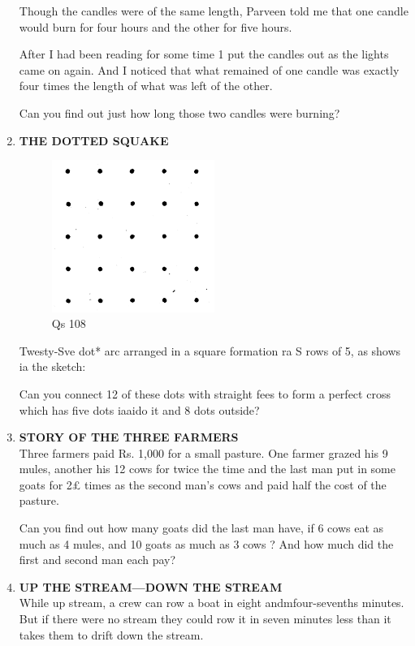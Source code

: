 \documentclass[12pt]{article}
\begin{document}
\begin{enumerate}
Though  the candles  were  of the same  length,  Parveen told me that  one candle  would  burn  for  four  hours  and the other  for five hours. 

After  I had been  reading  for some  time  1 put the candles  out as the lights  came  on again.  And  I noticed that what  remained  of one candle  was  exactly  four  times the length  of what  was  left of the other. 

Can you find  out just  how  long  those  two  candles were  burning? 
%
\item \textbf{THE  DOTTED  SQUAKE} \\
%
\begin{figure}[h]
\begin{center}
\includegraphics[width=0.5\textwidth]{images/sdevi_q108.png}
\caption{ Qs 108}
\end{center}
\end{figure}

Twesty-Sve  dot*  arc arranged  in a square  formation ra S rows  of 5, as shows  ia the sketch: 

Can you  connect  12 of these  dots  with  straight  fees to form  a perfect  cross  which  has five dots  iaaido  it and 8 dots outside? 
%
\item \textbf{STORY  OF  THE  THREE  FARMERS} \\ 
Three  farmers  paid  Rs.  1,000  for  a small  pasture. One farmer  grazed  his 9 mules,  another  his 12 cows  for twice  the time  and the last  man  put  in some  goats  for 2£ times  as the second  man's  cows  and paid  half  the  cost of the pasture. 

Can you find  out how  many  goats  did  the  last  man have,  if 6 cows  eat as much  as 4 mules,  and  10 goats  as much  as 3 cows  ? And  how  much  did the first  and  second man each  pay? 
%
\item \textbf{UP  THE  STREAM—DOWN  THE  STREAM} \\
While up stream, a crew can row a boat in eight andmfour-sevenths minutes. But if there were no stream they could row it in seven minutes less than it takes them to drift down the stream.


\end{enumerate}
\end{document}
